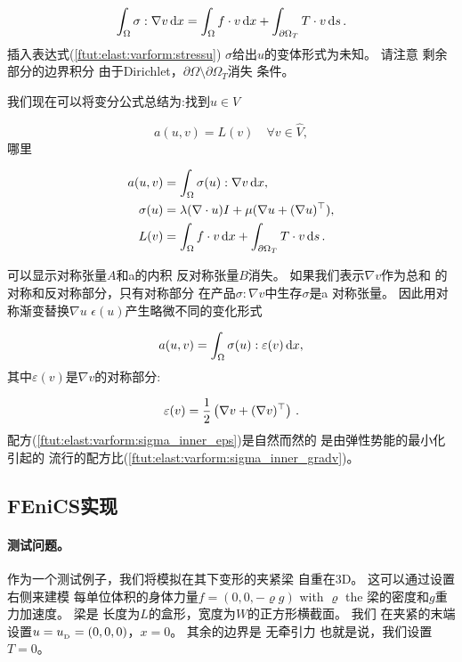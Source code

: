 \[
\int_\Omega \sigma : \nabla v \dx =
\int_\Omega f\cdot v \dx
+ \int_{\partial\Omega_T} T\cdot v\ds\tp\]
插入表达式(\ref{ftut:elast:varform:stressu})
$\sigma$给出$u$的变体形式为未知。 请注意
剩余部分的边界积分
由于Dirichlet，$\partial\Omega\setminus\partial\Omega_T$消失
条件。

我们现在可以将变分公式总结为:找到$u\in V$

\begin{equation}
a(u,v) = L(v)\quad\forall v\in\hat{V},
\end{equation}
哪里

\begin{align}
a(u,v) &= \int_\Omega\sigma(u) :\nabla v \dx,
\label{ftut:elast:varform:sigma_inner_gradv}
\\
\sigma(u) &= \lambda(\nabla\cdot u)I + \mu(\nabla u + (\nabla u)^{\top}),\\
L(v) &= \int_\Omega f\cdot v\dx + \int_{\partial\Omega_T}
T\cdot v\ds\tp
\end{align}

可以显示对称张量$A$和a的内积
反对称张量$B$消失。 如果我们表示$\nabla v$作为总和
的对称和反对称部分，只有对称部分
在产品$\sigma :\nabla v$中生存$\sigma$是a
对称张量。 因此用对称渐变替换$\nabla u$
$\epsilon(u)$产生略微不同的变化形式

\begin{equation}
a(u,v) = \int_\Omega\sigma(u) :\varepsilon(v) \dx,
\label{ftut:elast:varform:sigma_inner_eps}
\end{equation}
其中$\varepsilon(v)$是$\nabla v$的对称部分:

\[ \varepsilon(v) = \frac{1}{2}\left(\nabla v + (\nabla v)^{\top}\right)\tp\]
配方(\ref{ftut:elast:varform:sigma_inner_eps})是自然而然的
是由弹性势能的最小化引起的
流行的配方比(\ref{ftut:elast:varform:sigma_inner_gradv})。

\subsection{FEniCS实现}

\paragraph{测试问题。}
作为一个测试例子，我们将模拟在其下变形的夹紧梁
自重在3D。 这可以通过设置右侧来建模
每单位体积的身体力量$f=(0,0,-\varrho g)$ with $\varrho$ the
梁的密度和$g$重力加速度。 梁是
长度为$L$的盒形，宽度为$W$的正方形横截面。 我们
在夹紧的末端设置$u=\ub = (0,0,0)$，$x=0$。 其余的边界是
无牵引力 也就是说，我们设置$T = 0$。

